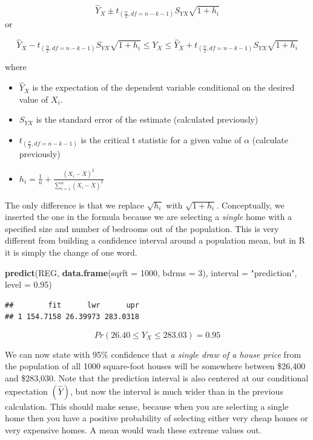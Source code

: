 \documentclass[
]{book}
\newenvironment{Shaded}{\begin{snugshade}}{\end{snugshade}}
\newcommand{\AttributeTok}[1]{\textcolor[rgb]{0.13,0.29,0.53}{#1}}
\newcommand{\DecValTok}[1]{\textcolor[rgb]{0.00,0.00,0.81}{#1}}
\newcommand{\FloatTok}[1]{\textcolor[rgb]{0.00,0.00,0.81}{#1}}
\newcommand{\FunctionTok}[1]{\textcolor[rgb]{0.13,0.29,0.53}{\textbf{#1}}}
\newcommand{\NormalTok}[1]{#1}
\newcommand{\StringTok}[1]{\textcolor[rgb]{0.31,0.60,0.02}{#1}}
\begin{document}
\[ \hat{Y}_{X} \pm t_{(\frac{\alpha}{2},df=n-k-1)}S_{YX} \sqrt{1+h_i}\]
or

\[ \hat{Y}_{X} - t_{(\frac{\alpha}{2},df=n-k-1)}S_{YX} \sqrt{1+h_i} \leq Y_{X} \leq \hat{Y}_{X} + t_{(\frac{\alpha}{2},df=n-k-1)}S_{YX} \sqrt{1+h_i}\]

where

\begin{itemize}
\item
  \(\hat{Y}_{X}\) is the expectation of the dependent variable conditional on the desired value of \(X_i\).
\item
  \(S_{YX}\) is the standard error of the estimate (calculated previously)
\item
  \(t_{(\frac{\alpha}{2},df=n-k-1)}\) is the critical t statistic for a given value of \(\alpha\) (calculate previously)
\item
  \(h_i = \frac{1}{n}+\frac{(X_i - \bar{X})^2}{\sum_{i=1}^n(X_i - \bar{X})^2}\)
\end{itemize}

The only difference is that we replace \(\sqrt{h_i}\) with \(\sqrt{1+h_i}\). Conceptually, we inserted the one in the formula because we are selecting a \emph{single} home with a specified size and number of bedrooms out of the population. This is very different from building a confidence interval around a population mean, but in R it is simply the change of one word.

\begin{Shaded}
\begin{Highlighting}[]
\FunctionTok{predict}\NormalTok{(REG,}
        \FunctionTok{data.frame}\NormalTok{(}\AttributeTok{sqrft =} \DecValTok{1000}\NormalTok{, }\AttributeTok{bdrms =} \DecValTok{3}\NormalTok{), }
        \AttributeTok{interval =} \StringTok{"prediction"}\NormalTok{,}
        \AttributeTok{level =} \FloatTok{0.95}\NormalTok{)}
\end{Highlighting}
\end{Shaded}

\begin{verbatim}
##        fit      lwr      upr
## 1 154.7158 26.39973 283.0318
\end{verbatim}

\[Pr(26.40\leq Y_{X} \leq 283.03)=0.95\]

We can now state with 95\% confidence that \emph{a single draw of a house price} from the population of all 1000 square-foot houses will be somewhere between \$26,400 and \$283,030. Note that the prediction interval is also centered at our conditional expectation \((\hat{Y})\), but now the interval is much wider than in the previous calculation. This should make sense, because when you are selecting a single home then you have a positive probability of selecting either very cheap homes or very expensive homes. A mean would wash these extreme values out.
\end{document}
